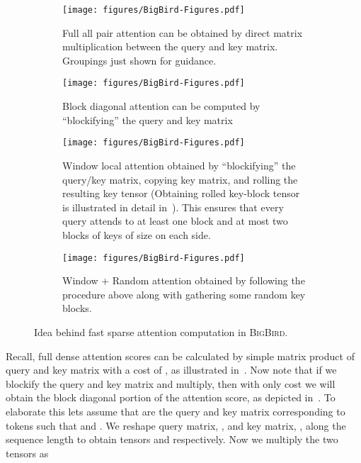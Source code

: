 \documentclass{article}
\newcommand{\bigb}{\textsc{BigBird}\xspace}
\begin{document}
\begin{figure}
    \vspace{-15mm}
    \centering
    \begin{subfigure}[b]{0.84\textwidth}
         \centering
         \texttt{[image: figures/BigBird-Figures.pdf]}
         \caption{Full all pair attention can be obtained by direct matrix multiplication between the query and key matrix. Groupings just shown for guidance.}
         \label{fig:apndx_full_attn_score}
     \end{subfigure}
     \hfill
     \begin{subfigure}[b]{0.84\textwidth}
         \centering
         \texttt{[image: figures/BigBird-Figures.pdf]}
         \caption{Block diagonal attention can be computed by ``blockifying'' the query and key matrix}
         \label{fig:apndx_block_diag_attn_score}
     \end{subfigure}
     \hfill
     \begin{subfigure}[b]{0.84\textwidth}
         \centering
         \texttt{[image: figures/BigBird-Figures.pdf]}
         \caption{Window local attention obtained by ``blockifying'' the query/key matrix, copying key matrix, and rolling the resulting key tensor (Obtaining rolled key-block tensor is illustrated in detail in~). This ensures that every query attends to at least one block and at most two blocks of keys of size  on each side.}
         \label{fig:apndx_wind_diag_attn_score}
     \end{subfigure}
     \begin{subfigure}[b]{0.84\textwidth}
         \centering
         \texttt{[image: figures/BigBird-Figures.pdf]}
         \caption{Window + Random attention obtained by following the procedure above along with gathering some random key blocks.}
         \label{fig:apndx_rand_att}
     \end{subfigure}
    \caption{Idea behind fast sparse attention computation in \bigb.}
    \label{fig:apndx_bigb_calc_idea}
    \vspace{-2mm}
\end{figure}

Recall, full dense attention scores can be calculated by simple matrix product of query and key matrix with a cost of , as illustrated in~.
Now note that if we blockify the query and key matrix and multiply, then with only  cost we will obtain the block diagonal portion of the attention score, as depicted in~.
To elaborate this lets assume that  are the query and key matrix corresponding to  tokens such that  and .
We reshape  query matrix, , and key matrix, , along the sequence length to obtain  tensors  and  respectively.
Now we multiply the two tensors as
\end{document}
